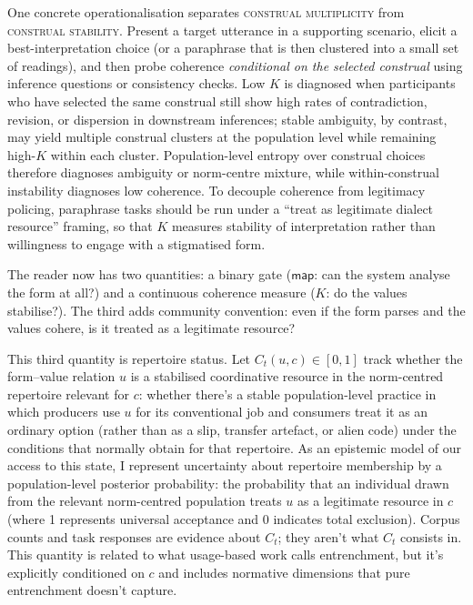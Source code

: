 \documentclass[12pt,letterpaper]{article}
\newcommand{\term}[1]{\textsc{#1}}
\begin{document}
One concrete operationalisation separates \term{construal multiplicity} from \term{construal stability}. Present a target utterance in a supporting scenario, elicit a best-interpretation choice (or a paraphrase that is then clustered into a small set of readings), and then probe coherence \emph{conditional on the selected construal} using inference questions or consistency checks. Low $K$ is diagnosed when participants who have selected the same construal still show high rates of contradiction, revision, or dispersion in downstream inferences; stable ambiguity, by contrast, may yield multiple construal clusters at the population level while remaining high-$K$ within each cluster. Population-level entropy over construal choices therefore diagnoses ambiguity or norm-centre mixture, while within-construal instability diagnoses low coherence. To decouple coherence from legitimacy policing, paraphrase tasks should be run under a \enquote{treat as legitimate dialect resource} framing, so that $K$ measures stability of interpretation rather than willingness to engage with a stigmatised form.

The reader now has two quantities: a binary gate ($\mathsf{map}$: can the system analyse the form at all?) and a continuous coherence measure ($K$: do the values stabilise?). The third adds community convention: even if the form parses and the values cohere, is it treated as a legitimate resource?

This third quantity is repertoire status. Let $C_t(u,c)\in[0,1]$ track whether the form--value relation $u$ is a stabilised coordinative resource in the norm-centred repertoire relevant for $c$: whether there's a stable population-level practice in which producers use $u$ for its conventional job and consumers treat it as an ordinary option (rather than as a slip, transfer artefact, or alien code) under the conditions that normally obtain for that repertoire. As an epistemic model of our access to this state, I represent uncertainty about repertoire membership by a population-level posterior probability: the probability that an individual drawn from the relevant norm-centred population treats $u$ as a legitimate resource in $c$ (where 1 represents universal acceptance and 0 indicates total exclusion). Corpus counts and task responses are evidence about $C_t$; they aren't what $C_t$ consists in. This quantity is related to what usage-based work calls entrenchment, but it's explicitly conditioned on $c$ and includes normative dimensions that pure entrenchment doesn't capture.
\end{document}
